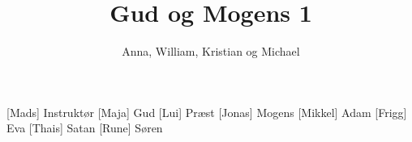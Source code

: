 \documentclass[a4paper,11pt]{article}
\title{Gud og Mogens 1}
\author{Anna, William, Kristian og Michael}
\begin{document}
\maketitle

\begin{roles}
[Mads] Instruktør
[Maja] Gud
[Lui] Præst
[Jonas] Mogens
[Mikkel] Adam
[Frigg] Eva
[Thais] Satan
[Rune] Søren


\end{roles}


  
\end{document}

